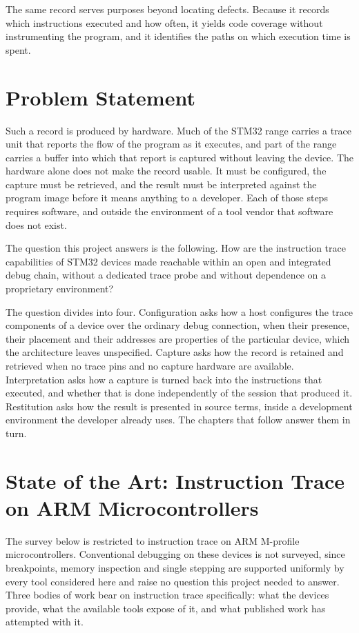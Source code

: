 The same record serves purposes beyond locating defects. Because it records which instructions executed and how often, it yields code coverage without instrumenting the program, and it identifies the paths on which execution time is spent.

\section{Problem Statement}
\label{sec:problem}

Such a record is produced by hardware. Much of the STM32 range carries a trace unit that reports the flow of the program as it executes, and part of the range carries a buffer into which that report is captured without leaving the device. The hardware alone does not make the record usable. It must be configured, the capture must be retrieved, and the result must be interpreted against the program image before it means anything to a developer. Each of those steps requires software, and outside the environment of a tool vendor that software does not exist.

The question this project answers is the following. How are the instruction trace capabilities of STM32 devices made reachable within an open and integrated debug chain, without a dedicated trace probe and without dependence on a proprietary environment?

The question divides into four. Configuration asks how a host configures the trace components of a device over the ordinary debug connection, when their presence, their placement and their addresses are properties of the particular device, which the architecture leaves unspecified. Capture asks how the record is retained and retrieved when no trace pins and no capture hardware are available. Interpretation asks how a capture is turned back into the instructions that executed, and whether that is done independently of the session that produced it. Restitution asks how the result is presented in source terms, inside a development environment the developer already uses. The chapters that follow answer them in turn.

\section{State of the Art: Instruction Trace on ARM Microcontrollers}
\label{sec:sota}

The survey below is restricted to instruction trace on ARM M-profile microcontrollers. Conventional debugging on these devices is not surveyed, since breakpoints, memory inspection and single stepping are supported uniformly by every tool considered here and raise no question this project needed to answer. Three bodies of work bear on instruction trace specifically: what the devices provide, what the available tools expose of it, and what published work has attempted with it.

